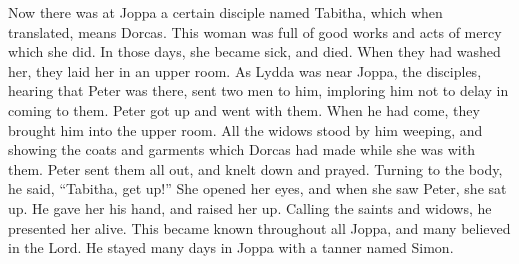 {\par }{\PP {}Now there was at Joppa a certain disciple named Tabitha, which when translated, means Dorcas. This woman was full of good works and acts of mercy which she did.
In those days, she became sick, and died. When they had washed her, they laid her in an upper room.
As Lydda was near Joppa, the disciples, hearing that Peter was there, sent two men to him, imploring him not to delay in coming to them.
Peter got up and went with them. When he had come, they brought him into the upper room. All the widows stood by him weeping, and showing the coats and garments which Dorcas had made while she was with them.
Peter sent them all out, and knelt down and prayed. Turning to the body, he said, “Tabitha, get up!” She opened her eyes, and when she saw Peter, she sat up.
He gave her his hand, and raised her up. Calling the saints and widows, he presented her alive.
This became known throughout all Joppa, and many believed in the Lord.
He stayed many days in Joppa with a tanner named Simon.

}
